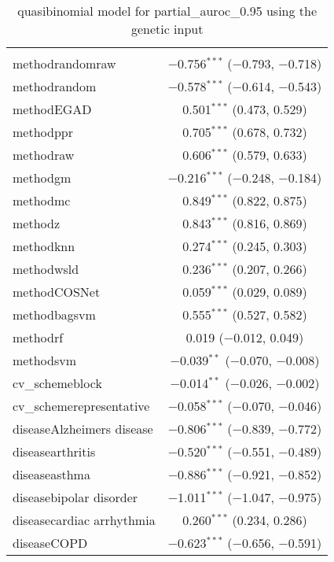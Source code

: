
\begin{table}[!htbp] \centering 
  \caption{quasibinomial model for partial_auroc_0.95 using the genetic input} 
  \label{} 
\begin{tabular}{@{\extracolsep{5pt}}lc} 
\\[-1.8ex]\hline 
\hline \\[-1.8ex] 
 methodrandomraw & $-$0.756$^{***}$ ($-$0.793, $-$0.718) \\ 
  methodrandom & $-$0.578$^{***}$ ($-$0.614, $-$0.543) \\ 
  methodEGAD & 0.501$^{***}$ (0.473, 0.529) \\ 
  methodppr & 0.705$^{***}$ (0.678, 0.732) \\ 
  methodraw & 0.606$^{***}$ (0.579, 0.633) \\ 
  methodgm & $-$0.216$^{***}$ ($-$0.248, $-$0.184) \\ 
  methodmc & 0.849$^{***}$ (0.822, 0.875) \\ 
  methodz & 0.843$^{***}$ (0.816, 0.869) \\ 
  methodknn & 0.274$^{***}$ (0.245, 0.303) \\ 
  methodwsld & 0.236$^{***}$ (0.207, 0.266) \\ 
  methodCOSNet & 0.059$^{***}$ (0.029, 0.089) \\ 
  methodbagsvm & 0.555$^{***}$ (0.527, 0.582) \\ 
  methodrf & 0.019 ($-$0.012, 0.049) \\ 
  methodsvm & $-$0.039$^{**}$ ($-$0.070, $-$0.008) \\ 
  cv\_schemeblock & $-$0.014$^{**}$ ($-$0.026, $-$0.002) \\ 
  cv\_schemerepresentative & $-$0.058$^{***}$ ($-$0.070, $-$0.046) \\ 
  diseaseAlzheimers disease & $-$0.806$^{***}$ ($-$0.839, $-$0.772) \\ 
  diseasearthritis & $-$0.520$^{***}$ ($-$0.551, $-$0.489) \\ 
  diseaseasthma & $-$0.886$^{***}$ ($-$0.921, $-$0.852) \\ 
  diseasebipolar disorder & $-$1.011$^{***}$ ($-$1.047, $-$0.975) \\ 
  diseasecardiac arrhythmia & 0.260$^{***}$ (0.234, 0.286) \\ 
  diseaseCOPD & $-$0.623$^{***}$ ($-$0.656, $-$0.591) \\ 

\end{tabular}
\end{table}
